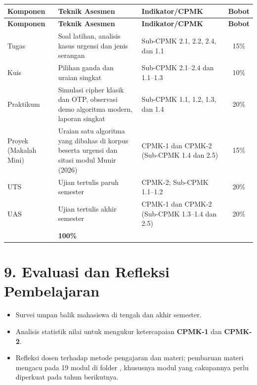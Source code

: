 \documentclass[12pt,a4paper]{article}
\begin{document}
{\footnotesize
\setlength{\tabcolsep}{4pt}
\begin{longtable}{|>{\raggedright\arraybackslash}p{2.8cm}|>{\raggedright\arraybackslash}p{4.2cm}|>{\raggedright\arraybackslash}p{5.0cm}|c|}
\hline
\textbf{Komponen} & \textbf{Teknik Asesmen} & \textbf{Indikator/CPMK} & \textbf{Bobot} \\
\hline
\endfirsthead
\hline
\textbf{Komponen} & \textbf{Teknik Asesmen} & \textbf{Indikator/CPMK} & \textbf{Bobot} \\
\hline
\endhead
Tugas & Soal latihan, analisis kasus urgensi dan jenis serangan & Sub-CPMK 2.1, 2.2, 2.4, dan 1.1 & 15\% \\
\hline
Kuis & Pilihan ganda dan uraian singkat & Sub-CPMK 2.1--2.4 dan 1.1--1.3 & 10\% \\
\hline
Praktikum & Simulasi cipher klasik dan OTP, observasi demo algoritma modern, laporan singkat & Sub-CPMK 1.1, 1.2, 1.3, dan 1.4 & 20\% \\
\hline
Proyek (Makalah Mini) & Uraian satu algoritma yang dibahas di korpus beserta urgensi dan sitasi modul Munir (2026) & CPMK-1 dan CPMK-2 (Sub-CPMK 1.4 dan 2.5) & 15\% \\
\hline
UTS & Ujian tertulis paruh semester & CPMK-2; Sub-CPMK 1.1--1.2 & 20\% \\
\hline
UAS & Ujian tertulis akhir semester & CPMK-1 dan CPMK-2 (Sub-CPMK 1.3--1.4 dan 2.5) & 20\% \\
\hline
\multicolumn{3}{|r|}{\textbf{Total}} & \textbf{100\%} \\
\hline
\end{longtable}
}

\vspace{0.5cm}

\section*{9. Evaluasi dan Refleksi Pembelajaran}
\begin{itemize}[leftmargin=*]
    \item Survei umpan balik mahasiswa di tengah dan akhir semester.
    \item Analisis statistik nilai untuk mengukur ketercapaian \textbf{CPMK-1} dan \textbf{CPMK-2}.
    \item Refleksi dosen terhadap metode pengajaran dan materi; pembaruan materi mengacu pada 19 modul di folder , khususnya modul yang cakupannya perlu diperkuat pada tahun berikutnya.
\end{itemize}
\end{document}

